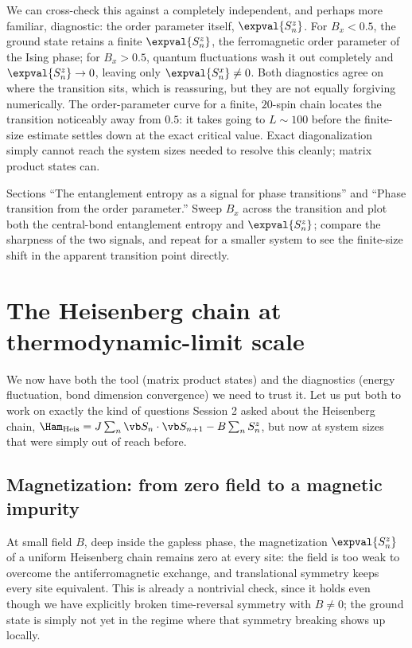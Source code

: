 \documentclass[all_sessions.tex]{subfiles}
\begin{document}
We can cross-check this against a completely independent, and perhaps more familiar, diagnostic:
the order parameter itself, $\expval{S_n^z}$. For $B_x < 0.5$, the ground state retains a finite
$\expval{S_n^z}$, the ferromagnetic order parameter of the Ising phase; for $B_x>0.5$, quantum
fluctuations wash it out completely and $\expval{S_n^z}\to 0$, leaving only $\expval{S_n^x}\ne0$.
Both diagnostics agree on where the transition sits, which is reassuring, but they are not
equally forgiving numerically. The order-parameter curve for a finite, $20$-spin chain locates the
transition noticeably away from $0.5$: it takes going to $L\sim 100$ before the finite-size
estimate settles down at the exact critical value. Exact diagonalization simply cannot reach the
system sizes needed to resolve this cleanly; matrix product states can.

\begin{notebook}
Sections ``The entanglement entropy as a signal for phase transitions'' and ``Phase transition
from the order parameter.'' Sweep $B_x$ across the transition and plot both the central-bond
entanglement entropy and $\expval{S_n^z}$; compare the sharpness of the two signals, and repeat
for a smaller system to see the finite-size shift in the apparent transition point directly.
\end{notebook}

\section{The Heisenberg chain at thermodynamic-limit scale}
We now have both the tool (matrix product states) and the diagnostics (energy fluctuation, bond
dimension convergence) we need to trust it. Let us put both to work on exactly the kind of
questions Session 2 asked about the Heisenberg chain, $\Ham_{\mathrm{Heis}} = J\sum_n
\vb S_n\cdot\vb S_{n+1} - B\sum_n S_n^z$, but now at system sizes that were simply out of reach
before.

\subsection{Magnetization: from zero field to a magnetic impurity}
At small field $B$, deep inside the gapless phase, the magnetization $\expval{S_n^z}$ of a uniform
Heisenberg chain remains zero at every site: the field is too weak to overcome the antiferromagnetic
exchange, and translational symmetry keeps every site equivalent. This is already a nontrivial
check, since it holds even though we have explicitly broken time-reversal symmetry with $B\ne0$; the
ground state is simply not yet in the regime where that symmetry breaking shows up locally.
\end{document}
